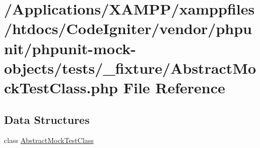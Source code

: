\hypertarget{_abstract_mock_test_class_8php}{}\section{/\+Applications/\+X\+A\+M\+P\+P/xamppfiles/htdocs/\+Code\+Igniter/vendor/phpunit/phpunit-\/mock-\/objects/tests/\+\_\+fixture/\+Abstract\+Mock\+Test\+Class.php File Reference}
\label{_abstract_mock_test_class_8php}
\subsection*{Data Structures}
\begin{DoxyCompactItemize}
\item 
class \mbox{\hyperlink{class_abstract_mock_test_class}{Abstract\+Mock\+Test\+Class}}
\end{DoxyCompactItemize}
